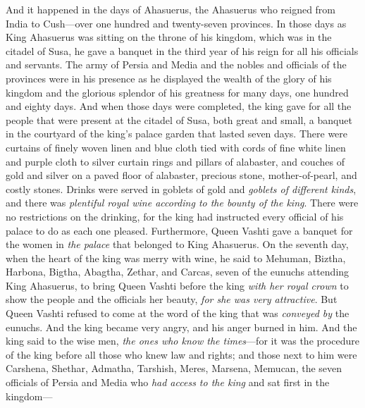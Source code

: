 
\begin{biblechapter} %
 And it happened in the days of Ahasuerus, the Ahasuerus who reigned from India to Cush—over one hundred and twenty-seven provinces.
\verse In those days as King Ahasuerus was sitting on the throne of his kingdom, which was in the citadel of Susa,
\verse he gave a banquet in the third year of his reign for all his officials and servants. The army of Persia and Media and the nobles and officials of the provinces were in his presence
\verse as he displayed the wealth of the glory of his kingdom and the glorious splendor of his greatness for many days, one hundred and eighty days.
\verse And when those days were completed, the king gave for all the people that were present at the citadel of Susa, both great and small, a banquet in the courtyard of the king’s palace garden that lasted seven days.
\verse There were curtains of finely woven linen and blue cloth tied with cords of fine white linen and purple cloth to silver curtain rings and pillars of alabaster, and couches of gold and silver on a paved floor of alabaster, precious stone, mother-of-pearl, and costly stones.
\verse Drinks were served in goblets of gold and \textit{goblets of different kinds}, and there was \textit{plentiful royal wine according to the bounty of the king}.
\verse There were no restrictions on the drinking, for the king had instructed every official of his palace to do as each one pleased.
\verse Furthermore, Queen Vashti gave a banquet for the women in \textit{the palace} that belonged to King Ahasuerus.
 On the seventh day, when the heart of the king was merry with wine, he said to Mehuman, Biztha, Harbona, Bigtha, Abagtha, Zethar, and Carcas, seven of the eunuchs attending King Ahasuerus,
\verse to bring Queen Vashti before the king \textit{with her royal crown} to show the people and the officials her beauty, \textit{for she was very attractive}.
\verse But Queen Vashti refused to come at the word of the king that was \textit{conveyed by} the eunuchs. And the king became very angry, and his anger burned in him.
\verse And the king said to the wise men, \textit{the ones who know the times}—for it was the procedure of the king before all those who knew law and rights;
\verse and those next to him were Carshena, Shethar, Admatha, Tarshish, Meres, Marsena, Memucan, the seven officials of Persia and Media who \textit{had access to the king} and sat first in the kingdom—

\end{biblechapter}
